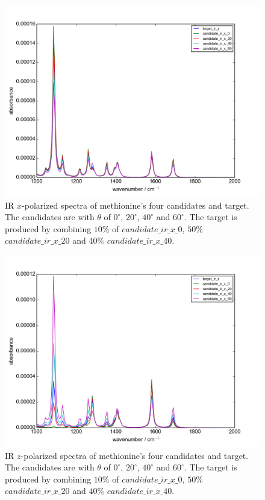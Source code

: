 \begin{figure}[!ht]
\centering
\includegraphics[scale=0.5]{Figures/Met_candidates_plotting_ir_x.png}
\caption{IR $x$-polarized spectra of methionine's four candidates and target. The candidates are with $\theta$ of $0^{\circ}$, $20^{\circ}$, $40^{\circ}$ and $60^{\circ}$. The target is produced by combining $10\%$ of $candidate\_ir\_x\_0$, $50\%$ $candidate\_ir\_x\_20$ and $40\%$ $candidate\_ir\_x\_40$. } \label{fig:2.2}
\end{figure}

\begin{figure}[!ht]
\centering
\includegraphics[scale=0.5]{Figures/Met_candidates_plotting_ir_z.png}
\caption{IR $z$-polarized spectra of methionine's four candidates and target. The candidates are with $\theta$ of $0^{\circ}$, $20^{\circ}$, $40^{\circ}$ and $60^{\circ}$. The target is produced by combining $10\%$ of $candidate\_ir\_x\_0$, $50\%$ $candidate\_ir\_x\_20$ and $40\%$ $candidate\_ir\_x\_40$.} \label{fig:2.3}
\end{figure}

